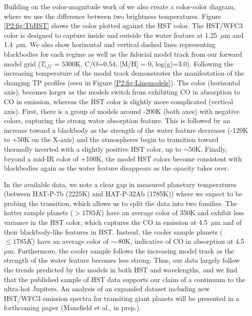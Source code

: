 Building on the color-magnitude work of \citet{Triaud2014c} we also create a color-color diagram, where we use the difference between two brightness temperatures. Figure \ref{P2:fig:TbHST} shows the \spitzer color plotted against the HST color. The HST/WFC3 color is designed to capture inside and outside the water feature at 1.25~$\mu$m and 1.4~$\mu$m. We also show horizontal and vertical dashed lines representing blackbodies for each regime as well as the fiducial model track from our forward model grid ($T_{eff}$ = 5300K, C/O=0.54, [M/H] = 0, log(g)=3.0). Following the increasing temperature of the model track demonstrates the manifestation of the changing TP profiles (seen in Figure \ref{P2:fig:Linemodels}). The \spitzer color (horizontal axis), becomes larger as the models switch from exhibiting CO in absorption to CO in emission, whereas the HST color is slightly more complicated (vertical axis). First, there is a group of models around -200K (both axes) with negative colors, capturing the strong water absorption feature. This is followed by an increase toward a blackbody as the strength of the water feature decreases (-120K to +50K on the X-axis) and the atmospheres begin to transition toward thermally inverted with a slightly positive HST color, up to $\sim50$K. Finally, beyond a mid-IR color of +100K, the model HST colors become consistent with blackbodies again as the water feature disappears as the  opacity takes over.

In the available data, we note a clear gap in measured planetary temperatures (between HAT-P-7b (2225K) and HAT-P-32Ab (1785K)) where we expect to be probing the transition, which allows us to split the data into two families. The hotter sample planets ($>1785K$) have an average \spitzer color of 350K and exhibit less variance in the HST color, which captures the CO in emission at 4.5~$\mu$m and of their blackbody-like features in HST. Instead, the cooler sample planets ($\leq1785K$) have an average \spitzer color of $\sim$-80K, indicative of CO in absorption at 4.5~$\mu$m. Furthermore, the cooler sample follows the increasing model track as the strength of the water feature becomes less strong. Thus, our data   largely follow  the trends predicted by the models in both HST and \spitzer wavelengths, and we find that the published sample of HST data supports our claim of a continuum to the ultra-hot Jupiters. An analysis of an expanded dataset including new HST/WFC3 emission spectra for transiting giant planets will be presented in a forthcoming paper (Mansfield et al., in prep.).

